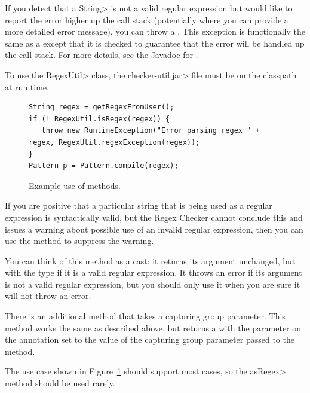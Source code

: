 \begin{sloppypar}
If you detect that a \<String> is not a valid regular expression but would like
to report the error higher up the call stack (potentially where you can
provide a more detailed error message), you can throw a
. This exception is
functionally the same as a
except that it is checked to guarantee that the error will be handled up the
call stack.  For more details, see the Javadoc for
.
\end{sloppypar}

To use the \<RegexUtil> class, the \<checker-util.jar> file
must be on the classpath at run time.

\begin{figure}
\begin{smaller}
\begin{Verbatim}
String regex = getRegexFromUser();
if (! RegexUtil.isRegex(regex)) {
   throw new RuntimeException("Error parsing regex " + regex, RegexUtil.regexException(regex));
}
Pattern p = Pattern.compile(regex);
\end{Verbatim}
\end{smaller}
\caption{Example use of  methods.}
\label{fig-regex-util-example}
\end{figure}


If you are positive that a particular string that is being used as a
regular expression is syntactically valid, but the Regex Checker cannot
conclude this and issues a warning about possible use of an invalid regular
expression, then you can use the
 method to suppress the
warning.

You can think of this method
as a cast:  it returns its argument unchanged, but with the type
 if it is a valid regular expression.  It throws an
error if its argument is not a valid regular expression, but you should
only use it when you are sure it will not throw an error.

There is an additional 
method that takes a capturing group parameter. This method works the same as
described above, but returns a  with the parameter on the
annotation set to the value of the capturing group parameter passed to the method.

The use case shown in Figure~\ref{fig-regex-util-example} should support most cases,
so the \<asRegex> method should be used rarely.




